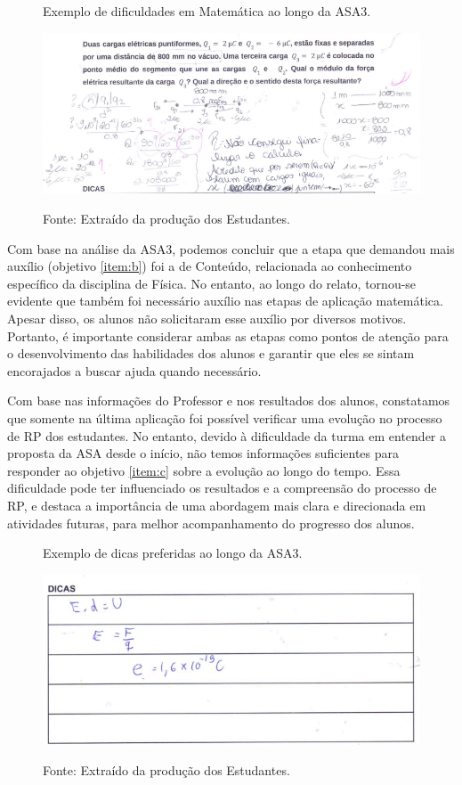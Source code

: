 \begin{figure}[ht]
\begin{center}
\caption{Exemplo de dificuldades em Matemática ao longo da ASA3.}
\includegraphics[width=1\textwidth]{fig/mtmasa3.png}
\label{fig:mtmasa3}
\caption*{Fonte: Extraído da produção dos Estudantes.}
\end{center}
\end{figure}

Com base na análise da ASA3, podemos concluir que a etapa que demandou mais auxílio (objetivo \ref{item:b}) foi a de Conteúdo, relacionada ao conhecimento específico da disciplina de Física. No entanto, ao longo do relato, tornou-se evidente que também foi necessário auxílio nas etapas de aplicação matemática. Apesar disso, os alunos não solicitaram esse auxílio por diversos motivos. Portanto, é importante considerar ambas as etapas como pontos de atenção para o desenvolvimento das habilidades dos alunos e garantir que eles se sintam encorajados a buscar ajuda quando necessário.

Com base nas informações do Professor e nos resultados dos alunos, constatamos que somente na última aplicação foi possível verificar uma evolução no processo de RP dos estudantes. No entanto, devido à dificuldade da turma em entender a proposta da ASA desde o início, não temos informações suficientes para responder ao objetivo \ref{item:c} sobre a evolução ao longo do tempo. Essa dificuldade pode ter influenciado os resultados e a compreensão do processo de RP, e destaca a importância de uma abordagem mais clara e direcionada em atividades futuras, para melhor acompanhamento do progresso dos alunos.

\begin{figure}[ht]
\begin{center}
\caption{Exemplo de dicas preferidas ao longo da ASA3.}
\includegraphics[width=1\textwidth]{fig/didasa3.png}
\label{fig:didiasa3}
\caption*{Fonte: Extraído da produção dos Estudantes.}
\end{center}
\end{figure}

